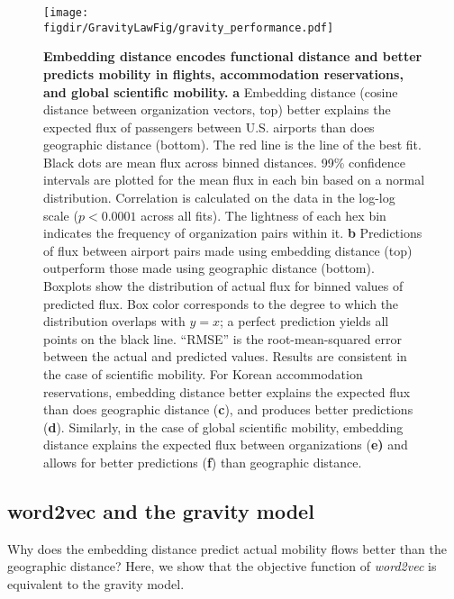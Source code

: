 \documentclass[12pt]{article} %
\def\figdir{../Figs}
\begin{document}
%
%
\begin{figure}[h!]
	\centering
	\texttt{[image: \\figdir/GravityLawFig/gravity\_performance.pdf]}
	\caption{
		\textbf{Embedding distance encodes functional distance and better predicts mobility in flights, accommodation reservations, and global scientific mobility.}
		\textbf{a} Embedding distance (cosine distance between organization vectors, top) better explains the expected flux of passengers between U.S. airports than does geographic distance (bottom).
		The red line is the line of the best fit.
		Black dots are mean flux across binned distances.
		99\% confidence intervals are plotted for the mean flux in each bin based on a normal distribution.
		Correlation is calculated on the data in the log-log scale ($p < 0.0001$ across all fits).
		The lightness of each hex bin indicates the frequency of organization pairs within it.
		\textbf{b} Predictions of flux between airport pairs made using embedding distance (top) outperform those made using geographic distance (bottom).
		Boxplots show the distribution of actual flux for binned values of predicted flux.
		Box color corresponds to the degree to which the distribution overlaps with $y = x$;
		a perfect prediction yields all points on the black line.
		``RMSE'' is the root-mean-squared error between the actual and predicted values.
		Results are consistent in the case of scientific mobility.
		For Korean accommodation reservations, embedding distance better explains the expected flux than does geographic distance (\textbf{c}), and produces better predictions (\textbf{d}).
		Similarly, in the case of global scientific mobility, embedding distance explains the expected flux between organizations (\textbf{e)} and allows for better predictions (\textbf{f}) than geographic distance.
	}
	\label{fig:gravity_performance}
\end{figure}



\subsection*{word2vec and the gravity model}

Why does the embedding distance predict actual mobility flows better than the geographic distance?
Here, we show that the objective function of {\it word2vec} is equivalent to the gravity model.
\end{document}
